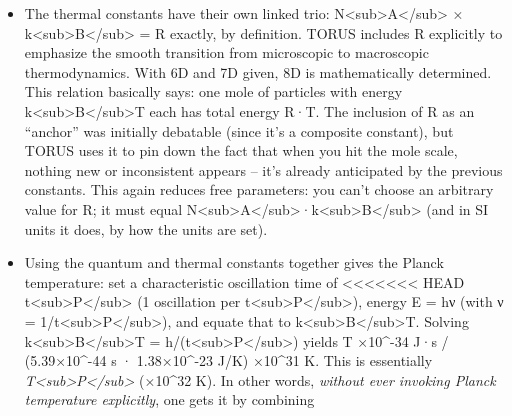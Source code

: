 \documentclass[]{article}
\begin{document}
{\begin{itemize}
  involving \alpha, c, and h, but it does). This interrelationship means
  TORUS effectively has \emph{one less free parameter}: G is not freely
  chosen, it's determined by lower anchors​. That's what we mean by the
  constants serving as anchors -- they lock each other into place. If,
  for instance, G were different, the whole tower of derived quantities
  (m\textless{}sub\textgreater{}P\textless{}/sub\textgreater{}, etc.)
  would shift and the cycle might not close.
\item
  The thermal constants have their own linked trio:
  N\textless{}sub\textgreater{}A\textless{}/sub\textgreater{} ×
  k\textless{}sub\textgreater{}B\textless{}/sub\textgreater{} = R
  exactly, by definition. TORUS includes R explicitly to emphasize the
  smooth transition from microscopic to macroscopic thermodynamics​.
  With 6D and 7D given, 8D is mathematically determined. This relation
  basically says: one mole of particles with energy
  k\textless{}sub\textgreater{}B\textless{}/sub\textgreater{}T each has
  total energy R·T. The inclusion of R as an ``anchor'' was initially
  debatable (since it's a composite constant), but TORUS uses it to pin
  down the fact that when you hit the mole scale, nothing new or
  inconsistent appears -- it's already anticipated by the previous
  constants​. This again reduces free parameters: you can't choose an
  arbitrary value for R; it must equal
  N\textless{}sub\textgreater{}A\textless{}/sub\textgreater{}·k\textless{}sub\textgreater{}B\textless{}/sub\textgreater{}
  (and in SI units it does, by how the units are set).
\item
  Using the quantum and thermal constants together gives the Planck
  temperature: set a characteristic oscillation time of
<<<<<<< HEAD
  t\textless sub\textgreater P\textless/sub\textgreater{} (1 oscillation
  per t\textless sub\textgreater P\textless/sub\textgreater), energy E =
  hν (with ν = 1/t\textless sub\textgreater P\textless/sub\textgreater),
  and equate that to
  k\textless sub\textgreater B\textless/sub\textgreater T. Solving
  k\textless sub\textgreater B\textless/sub\textgreater T =
  h/(t\textless sub\textgreater P\textless/sub\textgreater) yields T ×10\^{}-34 J·s / (5.39×10\^{}-44 s · 1.38×10\^{}-23 J/K) ×10\^{}31 K\hspace{0pt}. This is essentially
  \emph{T\textless sub\textgreater P\textless/sub\textgreater{}} (×10\^{}32 K)\hspace{0pt}. In other words, \emph{without ever
  invoking Planck temperature explicitly}, one gets it by combining

\end{itemize}}
\end{document}
